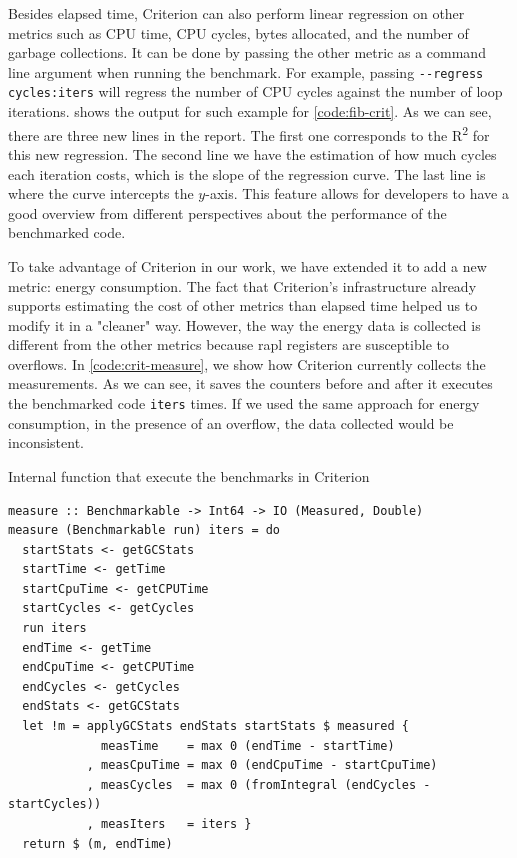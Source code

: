 Besides elapsed time, Criterion can also perform linear regression on other metrics such as CPU time, CPU cycles, bytes allocated, and the number of garbage collections. It can be done by passing the other metric as a command line argument when running the benchmark. For example, passing \texttt{-{}-regress cycles:iters} will regress the number of CPU cycles against the number of loop iterations.  shows the output for such example for \autoref{code:fib-crit}. As we can see, there are three new lines in the report. The first one corresponds to the R\textsuperscript{2} for this new regression. The second line we have the estimation of how much cycles each iteration costs, which is the slope of the regression curve. The last line is where the curve intercepts the $y$-axis. This feature allows for developers to have a good overview from different perspectives about the performance of the benchmarked code.

To take advantage of Criterion in our work, we have extended it to add a new metric: energy consumption. The fact that Criterion's infrastructure already supports estimating the cost of other metrics than elapsed time helped us to modify it in a "cleaner" way. However, the way the energy data is collected is different from the other metrics because \ac{rapl} registers are susceptible to overflows. In \autoref{code:crit-measure}, we show how Criterion currently collects the measurements. As we can see, it saves the counters before and after it executes the benchmarked code \texttt{iters} times. If we used the same approach for energy consumption, in the presence of an overflow, the data collected would be inconsistent.

\begin{listing}
  \caption{Internal function that execute the benchmarks in Criterion}
  \begin{verbatim}
measure :: Benchmarkable -> Int64 -> IO (Measured, Double)
measure (Benchmarkable run) iters = do
  startStats <- getGCStats
  startTime <- getTime
  startCpuTime <- getCPUTime
  startCycles <- getCycles
  run iters
  endTime <- getTime
  endCpuTime <- getCPUTime
  endCycles <- getCycles
  endStats <- getGCStats
  let !m = applyGCStats endStats startStats $ measured {
             measTime    = max 0 (endTime - startTime)
           , measCpuTime = max 0 (endCpuTime - startCpuTime)
           , measCycles  = max 0 (fromIntegral (endCycles - startCycles))
           , measIters   = iters }
  return $ (m, endTime)
  \end{verbatim}
  \label{code:crit-measure}
\end{listing}

